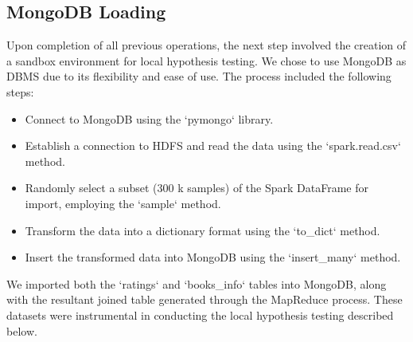 \subsection*{MongoDB Loading}
Upon completion of all previous operations, the next step involved the creation of a sandbox environment for local hypothesis testing.
We chose to use MongoDB as DBMS due to its flexibility and ease of use.
The process included the following steps:

\begin{itemize}[leftmargin=*, noitemsep]
    \item Connect to MongoDB using the `pymongo` library.
    \item Establish a connection to HDFS and read the data using the `spark.read.csv` method.
    \item Randomly select a subset (300 k samples) of the Spark DataFrame for import, employing the `sample` method.
    \item Transform the data into a dictionary format using the `to\_dict` method.
    \item Insert the transformed data into MongoDB using the `insert\_many` method.
\end{itemize}

\noindent
We imported both the `ratings` and `books\_info` tables into MongoDB, along with the resultant joined table generated through
the MapReduce process. These datasets were instrumental in conducting the local hypothesis testing described below.
